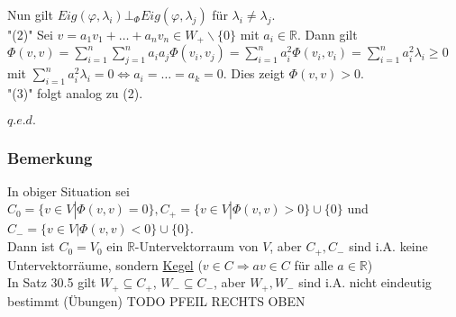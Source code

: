 \documentclass[a4paper]{article}
\newcommand{\ul}{\underline}
\renewcommand{\qed}{\begin{flushright}
\ul{\(q.e.d.\)}
\end{flushright}}
\let\phi\varphi
\begin{document}
Nun gilt \(Eig(\phi,\lambda_i)\bot_\Phi Eig(\phi,\lambda_j)\) für \(\lambda_i\neq \lambda_j\).\\
"(2)" Sei \(v=a_1v_1+\dots+a_nv_n\in W_+\backslash\{0\}\) mit \(a_i\in\mathbb{R}\). Dann gilt \(\Phi(v,v)=\sum_{i=1}^n\sum_{j=1}^n a_ia_j\Phi(v_i,v_j)=\sum_{i=1}^na_i^2\Phi(v_i,v_i)=\sum_{i=1}^na_i^2\lambda_i\geq 0\) mit \(\sum_{i=1}^na_i^2\lambda_i=0\Leftrightarrow a_i=\dots=a_k=0\). Dies zeigt \(\Phi(v,v)>0\).\\
"(3)" folgt analog zu (2).
\qed
\subsubsection{Bemerkung}
In obiger Situation sei \(C_0=\{v\in V|\Phi(v,v)=0\},C_+=\{v\in V|\Phi(v,v)>0\}\cup\{0\}\) und \(C_-=\{v\in V|\Phi(v,v)<0\}\cup \{0\}\).\\
Dann ist \(C_0=V_0\) ein \(\mathbb{R}\)-Untervektorraum von \(V\), aber \(C_+,C_-\) sind i.A. keine Untervektorräume, sondern \ul{Kegel} (\(v\in C\Rightarrow av\in C\) für alle \(a\in\mathbb{R}\))\\
In Satz 30.5 gilt \(W_+\subseteq C_+\), \(W_-\subseteq C_-\), aber \(W_+,W_-\) sind i.A. nicht eindeutig bestimmt (Übungen) TODO PFEIL RECHTS OBEN
\end{document}
